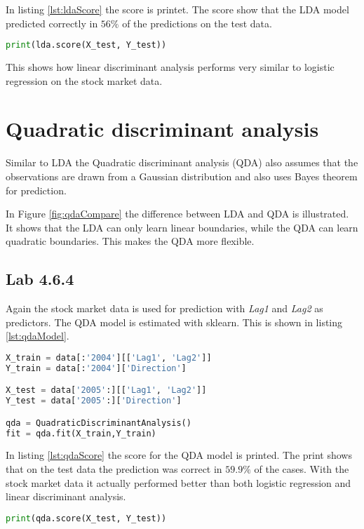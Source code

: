 In listing \ref{lst:ldaScore} the score is printet. The score show that the LDA model predicted correctly in $56\%$ of the predictions on the test data. 
\begin{lstlisting}[language=Python, label=lst:ldaScore, caption=printing lda score]
print(lda.score(X_test, Y_test))
\end{lstlisting}

This shows how linear discriminant analysis performs very similar to logistic regression on the stock market data.

\section{Quadratic discriminant analysis}
Similar to LDA the Quadratic discriminant analysis (QDA) also assumes that the observations are drawn from a Gaussian distribution and also uses Bayes theorem for prediction. 


In Figure \ref{fig:qdaCompare} the difference between LDA and QDA is illustrated. It shows that the LDA can only learn linear boundaries, while the QDA can learn quadratic boundaries. This makes the QDA more flexible. 

\subsection{Lab 4.6.4}
Again the stock market data is used for prediction with \emph{Lag1} and \emph{Lag2} as predictors. The QDA model is estimated with sklearn. This is shown in listing \ref{lst:qdaModel}.

\begin{lstlisting}[language=Python, label=lst:qdaModel, caption=Creating quadratic discriminant analysis model sklearn]
X_train = data[:'2004'][['Lag1', 'Lag2']]
Y_train = data[:'2004']['Direction']

X_test = data['2005':][['Lag1', 'Lag2']]
Y_test = data['2005':]['Direction']

qda = QuadraticDiscriminantAnalysis()
fit = qda.fit(X_train,Y_train)
\end{lstlisting}

In listing \ref{lst:qdaScore} the score for the QDA model is printed. The print shows that on the test data the prediction was correct in $59.9\%$ of the cases. With the stock market data it actually performed better than both logistic regression and linear discriminant analysis. 
\begin{lstlisting}[language=Python, label=lst:qdaScore, caption=Printing qda score]
print(qda.score(X_test, Y_test))
\end{lstlisting}

